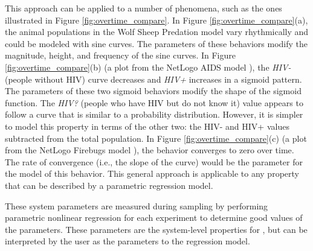 This approach can be applied to a number of phenomena, such as the ones illustrated in Figure \ref{fig:overtime_compare}.
In Figure \ref{fig:overtime_compare}(a), the animal populations in the Wolf Sheep Predation model vary rhythmically and could be modeled with sine curves.
The parameters of these behaviors modify the magnitude, height, and frequency of the sine curves.
In Figure \ref{fig:overtime_compare}(b) (a plot from the NetLogo AIDS model \cite{aids}), the \textit{HIV-} (people without HIV) curve decreases and  \textit{HIV+} increases in a sigmoid pattern.
The parameters of these two sigmoid behaviors modify the shape of the sigmoid function.
The \textit{HIV?} (people who have HIV but do not know it) value appears to follow a curve that is similar to a probability distribution. 
However, it is simpler to model this property in terms of the other two: the HIV- and HIV+ values subtracted from the total population.
In Figure \ref{fig:overtime_compare}(c) (a plot from the NetLogo Firebugs model \cite{bugs}), the behavior converges to zero over time.
The rate of convergence (i.e., the slope of the curve) would be the parameter for the model of this behavior.
This general approach is applicable to any property that can be described by a parametric regression model.

These system parameters are measured during sampling by performing parametric nonlinear regression for each experiment
to determine good values of the parameters.
These parameters are the system-level properties for \fw, but can be interpreted by the user as the parameters to the regression model.

